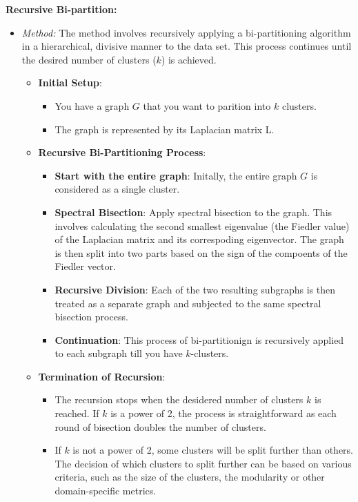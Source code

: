 \documentclass[unicode,11pt,a4paper,oneside,numbers=endperiod,openany]{scrartcl}
\begin{document}
\textbf{Recursive Bi-partition:}
\begin{itemize}
    \item \textit{Method:} The method involves recursively applying a bi-partitioning algorithm in a hierarchical, divisive manner to the data set. This process continues until the desired number of clusters (\( k \)) is achieved.
    \newline
    \begin{itemize}
     \item {\textbf{Initial Setup}:
     \begin{itemize}
      \item You have a graph $G$ that you want to parition into $k$ clusters.
      \item The graph is represented by its Laplacian matrix L.
     \end{itemize}
     }
     \item{\textbf{Recursive Bi-Partitioning Process}:
     \begin{itemize}
      \item {\textbf{Start with the entire graph}: Initally, the entire graph $G$ is considered as a single cluster.}
      \item{\textbf{Spectral Bisection}: Apply spectral bisection to the graph. This involves calculating the second smallest eigenvalue (the Fiedler value) of the Laplacian matrix and its correspoding eigenvector. The graph is then split into two parts based on the sign of the compoents of the Fiedler vector.}
      \item{\textbf{Recursive Division}: Each of the two resulting subgraphs is then treated as a separate graph and subjected to the same spectral bisection process.}
      \item{\textbf{Continuation}: This process of bi-partitionign is recursively applied to each subgraph till you have $k$-clusters}.
     \end{itemize}}
     \item{\textbf{Termination of Recursion}:
     \begin{itemize}
      \item The recursion stops when the desidered number of clusters $k$ is reached. If $k$ is a power of 2, the process is straightforward as each round of bisection doubles the number of clusters.
      \item If $k$ is not a power of 2, some clusters will be split further than others. The decision of which clusters to split further can be based on various criteria, such as the size of the clusters, the modularity or other domain-specific metrics.

\end{itemize}}
\end{itemize}
\end{itemize}
\end{document}
